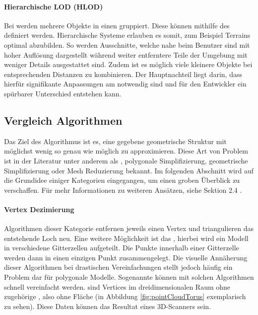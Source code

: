 \paragraph{Hierarchische LOD (HLOD)}
Bei  werden mehrere Objekte in einen  gruppiert. Diese  können mithilfe des  definiert werden.
Hierarchische Systeme erlauben es somit, zum Beispiel Terrains optimal abzubilden. So werden Ausschnitte, welche nahe beim Benutzer sind mit hoher Auflösung dargestellt während weiter entferntere Teile der Umgebung mit weniger Details ausgestattet sind.
Zudem ist es möglich viele kleinere Objekte bei entsprechenden Distanzen zu kombinieren.
Der Hauptnachteil liegt darin, dass hierfür signifikante Anpassungen am  notwendig sind und für den Entwickler ein spürbarer Unterschied entstehen kann.

\subsection{Vergleich Algorithmen}
\label{chap:lodAlgorithmComparison}

Das Ziel des Algorithmus ist es, eine gegebene geometrische Struktur mit möglichst wenig  so genau wie möglich zu approximieren.
Diese Art von Problem ist in der Literatur unter anderem als , polygonale Simplifizierung, geometrische Simplifizierung oder Mesh Reduzierung bekannt.
Im folgenden Abschnitt wird auf die Grundidee einiger Kategorien eingegangen, um einen groben Überblick zu verschaffen.
Für mehr Informationen zu weiteren Ansätzen, siehe  Sektion 2.4 \cite{quadridBasedSurfaceSimplification}.

\paragraph{Vertex Dezimierung}
Algorithmen dieser Kategorie entfernen jeweils einen Vertex und triangulieren das entstehende Loch neu.
Eine weitere Möglichkeit ist das , hierbei wird ein Modell in verschiedene Gitterzellen aufgeteilt. Die Punkte innerhalb einer Gitterzelle werden dann in einen einzigen Punkt zusammengelegt. Die visuelle Annäherung dieser Algorithmen bei drastischen Vereinfachungen stellt jedoch häufig ein Problem dar für polygonale Modelle. Sogenannte  können mit solchen Algorithmen schnell vereinfacht werden.
 sind Vertices im dreidimensionalen Raum ohne zugehörige , also ohne Fläche (in Abbildung \ref{fig:pointCloudTorus} exemplarisch zu sehen). Diese Daten können das Resultat eines 3D-Scanners sein.

